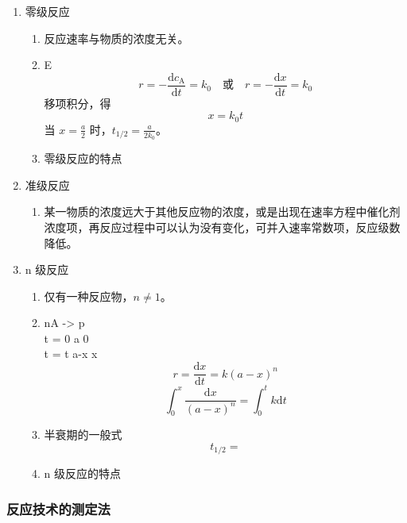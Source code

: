 \begin{enumerate}
    \item 零级反应
    \begin{enumerate}
        \item 反应速率与物质的浓度无关。
        \item E
        \begin{equation}
            r = - \frac{\mathrm{d}c_{\mathrm{A}}}{\mathrm{d}t} = k_0 \quad \text{或} \quad  r = - \frac{\mathrm{d}x}{\mathrm{d}t} = k_0
        \end{equation}
        移项积分，得
        \begin{equation}
            x = k_0 t
        \end{equation}
        当 $\displaystyle x = \frac{a}{2}$ 时，$\displaystyle t_{1/2} = \frac{a}{2k_0}$。
        \item 零级反应的特点
    \end{enumerate}
    \item 准级反应
    \begin{enumerate}
        \item 某一物质的浓度远大于其他反应物的浓度，或是出现在速率方程中催化剂浓度项，再反应过程中可以认为没有变化，可并入速率常数项，反应级数降低。
    \end{enumerate}
    \item n 级反应
    \begin{enumerate}
        \item 仅有一种反应物，$n \neq 1$。 
        \item nA -> p \\
        t = 0 a 0 \\
        t = t a-x x
        \begin{equation}
            r = \frac{\mathrm{d}x}{\mathrm{d}t} = k(a-x)^n
        \end{equation}
        \begin{equation}
            \int_{0}^{x} \frac{\mathrm{d}x}{(a-x)^n} = \int_{0}^{t} k\mathrm{d}t
        \end{equation}
        \item 半衰期的一般式
        \begin{equation}
            t_{\mathrm{1/2}} = 
        \end{equation}
        \item n 级反应的特点
    \end{enumerate}
\end{enumerate}

\subsubsection{反应技术的测定法}


